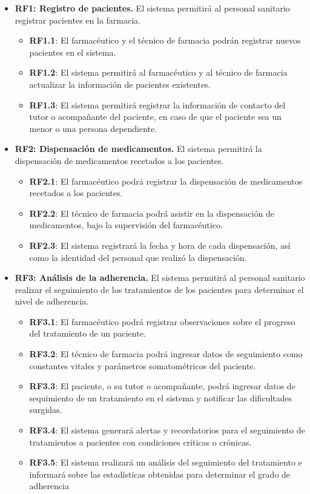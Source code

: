 \begin{itemize}
	\item \textbf{RF1: Registro de pacientes.} El sistema permitirá al personal sanitario registrar pacientes en la farmacia.
	
	\begin{itemize}
		 
		\item \textbf{RF1.1}: El farmacéutico y el técnico de farmacia podrán registrar nuevos pacientes en el sistema.
		\item \textbf{RF1.2}: El sistema permitirá al farmacéutico y al técnico de farmacia actualizar la información de pacientes existentes.
		\item \textbf{RF1.3}: El sistema permitirá registrar la información de contacto del tutor o acompañante del paciente, en caso de que el paciente sea un menor o una persona dependiente.
	\end{itemize}

	\item \textbf{RF2: Dispensación de medicamentos.} El sistema permitirá la dispensación de medicamentos recetados a los pacientes.
	
	\begin{itemize}
		\item \textbf{RF2.1}: El farmacéutico podrá registrar la dispensación de medicamentos recetados a los pacientes.
		\item \textbf{RF2.2}: El técnico de farmacia podrá asistir en la dispensación de medicamentos, bajo la supervisión del farmacéutico.
		\item \textbf{RF2.3}: El sistema registrará la fecha y hora de cada dispensación, así como la identidad del personal que realizó la dispensación.
	\end{itemize}
	
	\item \textbf{RF3: Análisis de la adherencia.} El sistema permitirá al personal sanitario realizar el seguimiento de los tratamientos de los pacientes para determinar el nivel de adherencia.
	
	\begin{itemize}
		\item \textbf{RF3.1}: El farmacéutico podrá registrar observaciones sobre el progreso del tratamiento de un paciente.
		\item \textbf{RF3.2}: El técnico de farmacia podrá ingresar datos de seguimiento como constantes vitales y parámetros somatométricos del paciente.
		\item \textbf{RF3.3}: El paciente, o su tutor o acompañante, podrá ingresar datos de sequimiento de un tratamiento en el sistema y notificar las dificultades surgidas.
		\item \textbf{RF3.4}: El sistema generará alertas y recordatorios para el seguimiento de tratamientos a pacientes con condiciones críticas o crónicas.
		\item \textbf{RF3.5}: El sistema realizará un análisis del seguimiento del tratamiento e informará sobre las estadísticas obtenidas para determinar el grado de adherencia 
	\end{itemize}
	

\end{itemize}
